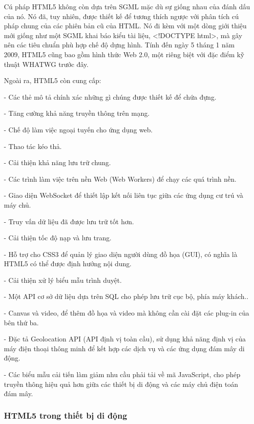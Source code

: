 Cú pháp HTML5 không còn dựa trên SGML mặc dù sự giống nhau của đánh dấu của nó. Nó đã, tuy nhiên, được thiết kế để tương thích ngược với phân tích cú pháp chung của các phiên bản cũ của HTML. Nó đi kèm với một dòng giới thiệu mới giống như một SGML khai báo kiểu tài liệu, <!DOCTYPE html>, mà gây nên các tiêu chuẩn phù hợp chế độ dựng hình. Tính đến ngày 5 tháng 1 năm 2009, HTML5 cũng bao gồm hình thức Web 2.0, một riêng biệt với đặc điểm kỹ thuật WHATWG trước đây.

Ngoài ra, HTML5 còn cung cấp:

\quad - Các thẻ mô tả chính xác những gì chúng được thiết kế để chứa đựng.

\quad - Tăng cường khả năng truyền thông trên mạng.

\quad - Chế độ làm việc ngoại tuyến cho ứng dụng web.

\quad - Thao tác kéo thả.

\quad - Cải thiện khả năng lưu trữ chung.

\quad - Các trình làm việc trên nền Web (Web Workers) để chạy các quá trình nền.

\quad - Giao diện WebSocket để thiết lập kết nối liên tục giữa các ứng dụng cư trú và máy chủ.

\quad - Truy vấn dữ liệu đã được lưu trữ tốt hơn.

\quad - Cải thiện tốc độ nạp và lưu trang.

\quad - Hỗ trợ cho CSS3 để quản lý giao diện người dùng đồ họa (GUI), có nghĩa là HTML5 có thể được định hướng nội dung.

\quad - Cải thiện xử lý biểu mẫu trình duyệt.

\quad - Một API cơ sở dữ liệu dựa trên SQL cho phép lưu trữ cục bộ, phía máy khách..

\quad - Canvas và video, để thêm đồ họa và video mà không cần cài đặt các plug-in của bên thứ ba.

\quad - Đặc tả Geolocation API (API định vị toàn cầu), sử dụng khả năng định vị của máy điện thoại thông minh để kết hợp các dịch vụ và các ứng dụng đám mây di động.

\quad - Các biểu mẫu cải tiến làm giảm nhu cầu phải tải về mã JavaScript, cho phép truyền thông hiệu quả hơn giữa các thiết bị di động và các máy chủ điện toán đám mây.

\subsubsection{HTML5 trong thiết bị di động}

